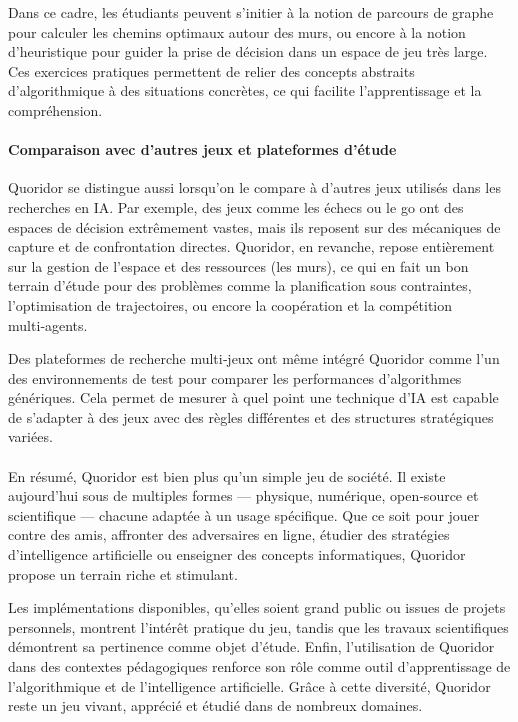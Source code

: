 \documentclass[a4paper]{article}
\begin{document}
Dans ce cadre, les étudiants peuvent s’initier à la notion de parcours de graphe pour calculer les chemins optimaux
autour des murs, ou encore à la notion d’heuristique pour guider la prise de décision dans un espace de jeu très large.
Ces exercices pratiques permettent de relier des concepts abstraits d’algorithmique à des situations concrètes, ce qui
facilite l’apprentissage et la compréhension.

\paragraph{Comparaison avec d’autres jeux et plateformes d’étude}

Quoridor se distingue aussi lorsqu’on le compare à d’autres jeux utilisés dans les recherches en IA. Par exemple, des jeux
comme les échecs ou le go ont des espaces de décision extrêmement vastes, mais ils reposent sur des mécaniques de capture et
de confrontation directes. Quoridor, en revanche, repose entièrement sur la gestion de l’espace et des ressources (les murs),
ce qui en fait un bon terrain d’étude pour des problèmes comme la planification sous contraintes, l’optimisation de trajectoires,
ou encore la coopération et la compétition multi‑agents.

Des plateformes de recherche multi‑jeux ont même intégré Quoridor comme l’un des environnements de test pour comparer les
performances d’algorithmes génériques. Cela permet de mesurer à quel point une technique d’IA est capable de s’adapter à des jeux avec des règles différentes et des structures stratégiques variées.

\paragraph{}

En résumé, Quoridor est bien plus qu’un simple jeu de société. Il existe aujourd’hui sous de multiples formes — physique, numérique, open‑source et scientifique — chacune adaptée à un usage spécifique. Que ce soit pour jouer contre des amis, affronter des adversaires en ligne, étudier des stratégies d’intelligence artificielle ou enseigner des concepts informatiques, Quoridor propose un terrain riche et stimulant.

Les implémentations disponibles, qu’elles soient grand public ou issues de projets personnels, montrent l’intérêt pratique du jeu, tandis que les travaux scientifiques démontrent sa pertinence comme objet d’étude. Enfin, l’utilisation de Quoridor dans des contextes pédagogiques renforce son rôle comme outil d’apprentissage de l’algorithmique et de l’intelligence artificielle. Grâce à cette diversité, Quoridor reste un jeu vivant, apprécié et étudié dans de nombreux domaines.
\end{document}
